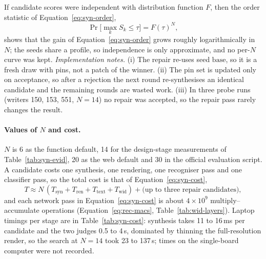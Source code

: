If candidate scores were independent with distribution function $F$, then the order statistic of Equation~\ref{eq:syn-order},
\begin{equation}
\Pr\bigl[\max_kS_k\le\tau\bigr]=F(\tau)^N,
\label{eq:syn-order}
\end{equation}
shows that the gain of Equation~\ref{eq:syn-order} grows roughly logarithmically in $N$; the seeds share a profile, so independence is only approximate, and no per-$N$ curve was kept.
\emph{Implementation notes.} (i) The repair re-uses seed $\mathrm{base}$, so it is a fresh draw with pins, not a patch of the winner. (ii) The pin set is updated only on acceptance, so after a rejection the next round re-synthesises an identical candidate and the remaining rounds are wasted work. (iii) In three probe runs (writers 150, 153, 551, $N=14$) no repair was accepted, so the repair pass rarely changes the result.

\paragraph{Values of $N$ and cost.}
$N$ is 6 as the function default, 14 for the design-stage measurements of Table~\ref{tab:syn-evid}, 20 as the web default and 30 in the official evaluation script.
A candidate costs one synthesis, one rendering, one recogniser pass and one classifier pass, so the total cost is that of Equation~\ref{eq:syn-cost},
\begin{equation}
T\approx N\,(T_{\mathrm{syn}}+T_{\mathrm{ren}}+T_{\mathrm{text}}+T_{\mathrm{wid}})+\text{(up to three repair candidates)},
\label{eq:syn-cost}
\end{equation}
and each network pass in Equation~\ref{eq:syn-cost} is about $4\times10^9$ multiply--accumulate operations (Equation~\ref{eq:rec-macs}, Table~\ref{tab:wid-layers}).
Laptop timings per stage are in Table~\ref{tab:syn-cost}: synthesis takes 11 to 16\,ms per candidate and the two judges 0.5 to 4\,s, dominated by thinning the full-resolution render, so the search at $N=14$ took 23 to 137\,s; times on the single-board computer were not recorded.

